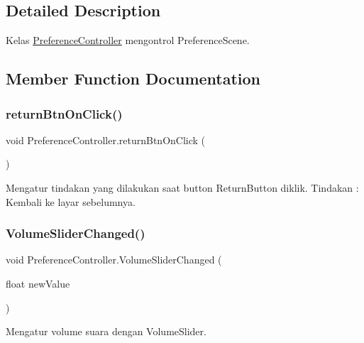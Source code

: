 \subsection{Detailed Description}
Kelas \hyperlink{class_preference_controller}{Preference\+Controller} mengontrol Preference\+Scene. 



\subsection{Member Function Documentation}
\hypertarget{class_preference_controller_a27079e068e495b9815668db8ceaff04b}{}\label{class_preference_controller_a27079e068e495b9815668db8ceaff04b} 
\subsubsection{\texorpdfstring{return\+Btn\+On\+Click()}{returnBtnOnClick()}}
{\footnotesize\ttfamily void Preference\+Controller.\+return\+Btn\+On\+Click (\begin{DoxyParamCaption}{ }\end{DoxyParamCaption})}



Mengatur tindakan yang dilakukan saat button Return\+Button diklik. Tindakan \+: Kembali ke layar sebelumnya. 

\hypertarget{class_preference_controller_ac1f51dd39b0846f7259bcf2e028cd486}{}\label{class_preference_controller_ac1f51dd39b0846f7259bcf2e028cd486} 
\subsubsection{\texorpdfstring{Volume\+Slider\+Changed()}{VolumeSliderChanged()}}
{\footnotesize\ttfamily void Preference\+Controller.\+Volume\+Slider\+Changed (\begin{DoxyParamCaption}\item[{float}]{new\+Value }\end{DoxyParamCaption})}



Mengatur volume suara dengan Volume\+Slider. 


